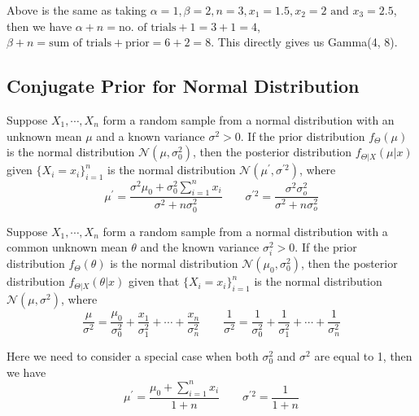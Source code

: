 Above is the same as taking \(\alpha = 1, \beta = 2, n = 3, x_1 = 1.5, x_2 = 2 \text{ and } x_3 = 2.5\), then we have \(\alpha + n = \text{no. of trials} + 1 = 3 + 1= 4\), \(\beta + n = \text{sum of trials} + \text{prior} = 6 + 2 = 8\). This directly gives us Gamma(4, 8). 

\subsection{Conjugate Prior for Normal Distribution}
\begin{definition}
  Suppose \(X_1, \cdots, X_n\) form a random sample from a normal distribution with an unknown mean \(\mu\) and a known variance \(\sigma^2 > 0\). If the prior distribution \(f_{\Theta}(\mu)\) is the normal distribution \(\mathcal{N} (\mu, \sigma_0^2)\), then the posterior distribution \(f_{\Theta \vert X} (\mu \vert x)\) given \(\{X_i = x_i\}_{i=1} ^n\) is the normal distribution \(\mathcal{N}(\mu^{\prime}, \sigma^{\prime2})\), where 
  \[
    \mu^{\prime} = \dfrac{\sigma^2\mu_0 + \sigma_0^2 \sum_{i = 1}^n x_i}{\sigma^2 + n\sigma_0^2} \quad\quad \sigma^{\prime2} = \dfrac{\sigma^2\sigma_o^2}{\sigma^2 + n\sigma_o^2}
  \] 
\end{definition}

\begin{definition}
  Suppose \(X_1, \cdots, X_n\) form a random sample from a normal distribution with a common unknown mean \(\theta\) and the known variance \(\sigma_i^2 > 0\). If the prior distribution \(f_{\Theta}(\theta)\) is the normal distribution \(\mathcal{N} (\mu_0, \sigma_0^2)\), then the posterior distribution \(f_{\Theta \vert X} (\theta \vert x)\) given that \(\{X_i = x_i\}_{i=1} ^n\) is the normal distribution \(\mathcal{N}(\mu, \sigma^2)\), where 
  \[
    \dfrac{\mu}{\sigma^2} = \dfrac{\mu_0}{\sigma_0^2} + \dfrac{x_1}{\sigma_1^2} + \cdots + \dfrac{x_n}{\sigma_n^2} \quad\quad \dfrac{1}{\sigma^2} = \dfrac{1}{\sigma_0^2} + \dfrac{1}{\sigma_1^2} + \cdots + \dfrac{1}{\sigma_n^2}
  \] 
\end{definition}

Here we need to consider a special case when both \(\sigma_0^2\) and \(\sigma^2\) are equal to 1, then we have 
\[
  \mu^{\prime} = \dfrac{\mu_0 + \sum_{i = 1}^n x_i}{1 + n} \quad\quad \sigma^{\prime2} = \dfrac{1}{1 + n}
\]


